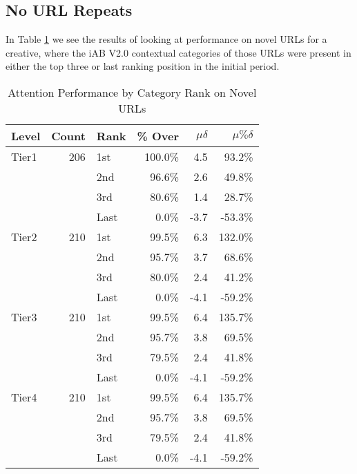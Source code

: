 \documentclass[sigconf]{acmart}
\begin{document}
\subsection{No URL Repeats}

In Table \ref{tab:nourlrepeats} we see the results of looking at performance on novel
URLs for a creative, where the iAB V2.0 contextual categories of those URLs were present
in either the top three or last ranking position in the initial period.

\begin{table}
\caption{Attention Performance by Category Rank on Novel URLs}
\label{tab:nourlrepeats}
\begin{tabular}{|l|r|l|r|r|r|}
\toprule
Level   &Count    &Rank &\% Over  &$\mu\delta$  &$\mu\%\delta$        \\
\midrule
Tier1   &206      &1st  &100.0\%    &4.5         &93.2\%     \\
        &         &2nd  &96.6\%     &2.6         &49.8\%     \\
        &         &3rd  &80.6\%     &1.4         &28.7\%     \\
        &         &Last &0.0\%      &-3.7        &-53.3\%     \\
Tier2   &210      &1st  &99.5\%     &6.3         &132.0\%     \\
        &         &2nd  &95.7\%     &3.7         &68.6\%     \\
        &         &3rd  &80.0\%     &2.4         &41.2\%     \\
        &         &Last &0.0\%      &-4.1        &-59.2\%     \\
Tier3   &210      &1st  &99.5\%     &6.4         &135.7\%     \\
        &         &2nd  &95.7\%     &3.8         &69.5\%     \\
        &         &3rd  &79.5\%     &2.4         &41.8\%     \\
        &         &Last &0.0\%      &-4.1        &-59.2\%     \\
Tier4   &210      &1st  &99.5\%     &6.4         &135.7\%     \\
        &         &2nd  &95.7\%     &3.8         &69.5\%     \\
        &         &3rd  &79.5\%     &2.4         &41.8\%     \\
        &         &Last &0.0\%      &-4.1        &-59.2\%     \\
\bottomrule
\end{tabular}
\end{table}
\end{document}
